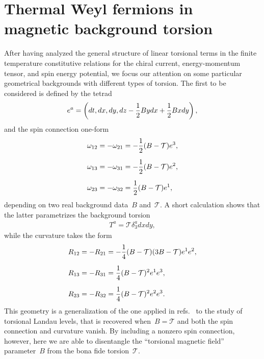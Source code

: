 \documentclass[11pt,a4paper]{article}
\begin{document}
\section{Thermal Weyl fermions in magnetic background torsion}
\label{sec:microscopic}

After having analyzed the general structure of linear torsional terms in the finite temperature
constitutive relations for the
chiral current,
energy-momentum tensor, and spin energy potential, we focus our attention on some 
particular geometrical backgrounds with 
different types of torsion. 
The first to be considered is defined by the tetrad
\begin{align}
e^{a}=\left(dt,dx,dy,dz-{1\over 2}Bydx+{1\over 2}Bxdy\right),
\label{eq:vierbein_torsional}
\end{align}
and the spin connection one-form
\begin{align}
\omega_{12}&=-\omega_{21}=-{1\over 2}(B-\mathcal{T})e^{3}, \nonumber \\[0.2cm]
\omega_{13}&=-\omega_{31}=-{1\over 2}(B-\mathcal{T})e^{2}, 
\label{eq:full_spin_connection_nonzero}\\[0.2cm]
\omega_{23}&=-\omega_{32}={1\over 2}(B-\mathcal{T})e^{1},
\nonumber
\end{align}
depending on two real background data~$B$ and~$\mathcal{T}$. 
A short calculation shows that the latter parametrizes the
background torsion
\begin{align}
T^{a}=\mathcal{T}\delta_{3}^{a}dxdy,
\label{eq:torsion_Stone_etal}
\end{align}
while the curvature takes the form
\begin{align}
R_{12}&=-R_{21}=-{1\over 4}(B-\mathcal{T})(3B-\mathcal{T})e^{1}e^{2},
\nonumber \\[0.2cm]
R_{13}&=-R_{31}={1\over 4}(B-\mathcal{T})^{2}e^{1}e^{3}, \\[0.2cm]
R_{23}&=-R_{32}={1\over 4}(B-\mathcal{T})^{2}e^{2}e^{3}.
\nonumber
\end{align}
This geometry is a generalization of the
one applied in refs.~\cite{Huang:2019haq,Laurila:2020yll} to the study of torsional Landau levels, 
that is recovered when~$B=\mathcal{T}$ and both the spin connection and curvature vanish. 
By including a nonzero
spin connection, however, here we are able to disentangle the ``torsional magnetic field''
parameter~$B$ from the bona fide torsion~$\mathcal{T}$. 
\end{document}
